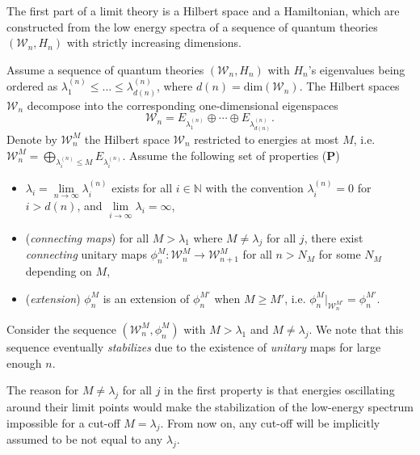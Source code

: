 \documentclass[twoside,11pt,titlepage]{amsart}
\renewcommand{\=}[1]{\stackrel{#1}{=}} %
\theoremstyle{definition}
\theoremstyle{remark}
\begin{document}
\hfill \break 
The first part of a limit theory is a Hilbert space and a Hamiltonian, which are constructed from the low energy spectra of a sequence of quantum theories $(\mathcal{W}_n,H_n)$ with strictly increasing dimensions.

Assume a sequence of quantum theories $(\mathcal{W}_n,H_n)$ with $H_n$'s eigenvalues being ordered as $\lambda_1^{(n)} \le \ldots \le \lambda_{d(n)}^{(n)}$, where $d(n)=\text{dim}(\mathcal{W}_n)$. The Hilbert spaces $\mathcal{W}_n$ decompose into the corresponding one-dimensional eigenspaces
$$\mathcal{W}_n=E_{\lambda_1^{(n)}} \oplus \cdots \oplus E_{\lambda_{d(n)}^{(n)}}.$$ 
Denote by $\mathcal{W}_n^M$ the Hilbert space $\mathcal{W}_n$ restricted to energies at most $M$, i.e. $\mathcal{W}_n^M=\bigoplus_{\lambda_i^{(n)}\leq M}E_{\lambda_i^{(n)}}$. Assume the following set of properties (\textbf{P}\label{P})
\begin{itemize}
    \item $\lambda_i=\lim\limits_{n \to \infty} \lambda_i^{(n)}$ exists for all $i \in \mathbb{N}$ with the convention $\lambda_i^{(n)}=0$ for $i>d(n)$, and $\lim\limits_{i\to \infty}\lambda_i=\infty$,
    \item (\textit{connecting maps}) for all $M > \lambda_1$ where $M \neq \lambda_j$ for all $j$, there exist \textit{connecting} unitary maps $\phi_n^M: \mathcal{W}_n^M \to \mathcal{W}_{n+1}^M$ for all $n>N_M$ for some $N_M$ depending on $M$,
    \item (\textit{extension}) $\phi_n^M$ is an extension of $\phi_n^{M'}$ when $M \ge M'$, i.e. $\phi_n^M|_{\mathcal{W}_n^{M'}}=\phi_n^{M'}$.
\end{itemize}
Consider the sequence $(\mathcal{W}_n^M,\phi_n^M)$ with $M > \lambda_1$ and $M\neq \lambda_j$. We note that this sequence eventually \textit{stabilizes} due to the existence of \textit{unitary} maps for large enough $n$.

The reason for $M \neq \lambda_j$ for all $j$ in the first property is that energies oscillating around their limit points would make the stabilization of the low-energy spectrum impossible for a cut-off $M=\lambda_j$. From now on, any cut-off will be implicitly assumed to be not equal to any $\lambda_j$.
\end{document}
